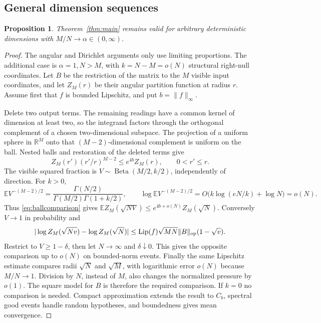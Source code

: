 \documentclass[11pt]{article}
\numberwithin{equation}{section}
\newtheorem{proposition}[theorem]{Proposition}
\theoremstyle{definition}
\newcommand{\E}{\mathbb E}
\newcommand{\R}{\mathbb R}
\newcommand{\Lip}{\operatorname{Lip}}
\newcommand{\norm}[1]{\lVert #1\rVert}
\begin{document}
\subsection{General dimension sequences}
\begin{proposition}\label{prop:aspect}
Theorem~\ref{thm:main} remains valid for arbitrary deterministic dimensions with $M/N\to\alpha\in(0,\infty)$.
\end{proposition}
\begin{proof}
The angular and Dirichlet arguments only use limiting proportions. The additional case is $\alpha=1,N>M$, with $k=N-M=o(N)$ structural right-null coordinates. Let $B$ be the restriction of the matrix to the $M$ visible input coordinates, and let $Z_M(r)$ be their angular partition function at radius $r$. Assume first that $f$ is bounded Lipschitz, and put $b=\norm f_\infty$.

Delete two output terms. The remaining readings have a common kernel of dimension at least two, so the integrand factors through the orthogonal complement of a chosen two-dimensional subspace. The projection of a uniform sphere in $\R^M$ onto that $(M-2)$-dimensional complement is uniform on the ball. Nested balls and restoration of the deleted terms give
\begin{equation}\label{eq:ballcomparison}
Z_M(r')(r'/r)^{M-2}\le e^{4b}Z_M(r),\qquad 0<r'\le r.
\end{equation}
The visible squared fraction is $V\sim\operatorname{Beta}(M/2,k/2)$, independently of direction. For $k>0$,
\[
\E V^{-(M-2)/2}=\frac{\Gamma(N/2)}{\Gamma(M/2)\Gamma(1+k/2)},
\qquad
\log\E V^{-(M-2)/2}=O\big(k\log(eN/k)+\log N\big)=o(N).
\]
Thus \eqref{eq:ballcomparison} gives $\E Z_M(\sqrt{NV})\le e^{4b+o(N)}Z_M(\sqrt N)$. Conversely $V\to1$ in probability and
\[
|\log Z_M(\sqrt{Nv})-\log Z_M(\sqrt N)|
\le\Lip(f)\sqrt{MN}\norm B_{\rm op}(1-\sqrt v).
\]
Restrict to $V\ge1-\delta$, then let $N\to\infty$ and $\delta\downarrow0$. This gives the opposite comparison up to $o(N)$ on bounded-norm events. Finally the same Lipschitz estimate compares radii $\sqrt N$ and $\sqrt M$, with logarithmic error $o(N)$ because $M/N\to1$. Division by $N$, instead of $M$, also changes the normalized pressure by $o(1)$. The square model for $B$ is therefore the required comparison. If $k=0$ no comparison is needed. Compact approximation extends the result to $C_b$, spectral good events handle random hypotheses, and boundedness gives mean convergence.
\end{proof}
\end{document}
